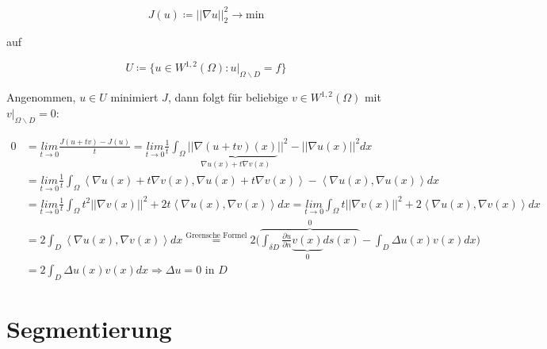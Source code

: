 \documentclass{article}
\theoremstyle{plain}
\theoremstyle{definition}
\numberwithin{equation}{section}
\newcommand{\norm}[1] {
\left|\left| #1 \right|\right|
}
\newcommand{\skprod}[2]{
\left \langle #1,#2 \right \rangle
}
\begin{document}
    \[ J(u) \coloneqq  \norm{\nabla u}_2^2 \to \text{min} \]

    auf

    \[U \coloneqq \{u \in W^{1,2}(\Omega) : u|_{\Omega \backslash D} = f\} \]

    Angenommen, $u \in U$ minimiert $J$, dann folgt für beliebige $v \in W^{1,2} (\Omega)$ mit $v|_{\Omega \backslash D}=0$:

    \begin{align*}
      0 &= \underset{t \to 0}{lim} \frac{J(u+tv) - J(u)}{t} = \underset{t \to 0}{lim} \frac{1}{t} \int_\Omega ||\underbrace{\nabla(u+tv)(x)}_{\nabla u(x) + t \nabla v(x)}||^2 - \norm{\nabla u(x)}^2 dx\\
      &=\underset{t \to 0}{lim} \frac{1}{t} \int_\Omega \skprod{\nabla u(x) + t \nabla v(x)}{\nabla u(x) + t \nabla v(x)} - \skprod{\nabla u (x)}{\nabla u (x)} dx\\
      &=\underset{t \to 0}{lim} \frac{1}{t} \int_\Omega t^2 \norm{\nabla v(x)}^2 + 2 t \skprod{\nabla u(x)}{\nabla v(x)} dx =  \underset{t \to 0}{lim} \int_\Omega t \norm{\nabla v(x)}^2 + 2 \skprod{\nabla u(x)}{\nabla v(x)} dx\\
      &=2 \int_D \skprod{\nabla u(x)}{\nabla v(x)} dx \overset{\text{Greensche Formel}}{=} 2 \biggl( \overbrace{\int_{\delta D} \frac{\partial u}{\partial n} \underbrace{v(x)}_{0} ds(x)}^{0} - \int_D \Delta u(x) v(x) dx \biggr)\\
      &=2 \int_D \Delta u(x) v(x) dx \Rightarrow \Delta u =0 \text{ in } D
    \end{align*}

    \section{Segmentierung}
\end{document}

